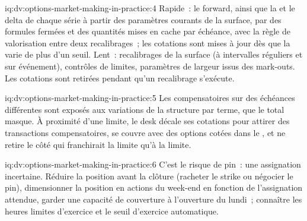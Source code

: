 \begin{solution}{iq:dv:options-market-making-in-practice:4}
Rapide~: le forward, ainsi que la  et le delta de chaque série à partir des paramètres courants de la surface, par des formules fermées et des quantités mises en cache par échéance, avec la règle de
valorisation entre deux recalibrages~; les cotations sont mises à jour dès que la  varie de plus d'un seuil. Lent~: recalibrages de la surface (à intervalles réguliers et sur événement), contrôles de limites, paramètres de largeur issus des
mark-outs. Les cotations sont retirées pendant qu'un recalibrage s'exécute.
\end{solution}

\begin{solution}{iq:dv:options-market-making-in-practice:5}
Les  compensatoires sur des échéances différentes sont exposés aux variations de la structure par terme, que le  total masque. À proximité d'une limite, le desk décale ses cotations pour attirer
des transactions compensatoires, se couvre avec des options cotées dans le , et ne retire le côté qui franchirait la limite qu'à la limite.
\end{solution}

\begin{solution}{iq:dv:options-market-making-in-practice:6}
C'est le risque de pin~: une assignation incertaine. Réduire la position avant la clôture (racheter le strike ou négocier le pin), dimensionner la position en actions du week-end en fonction de
l'assignation attendue, garder une capacité de couverture à l'ouverture du lundi~; connaître les heures limites d'exercice et le seuil d'exercice automatique.
\end{solution}

